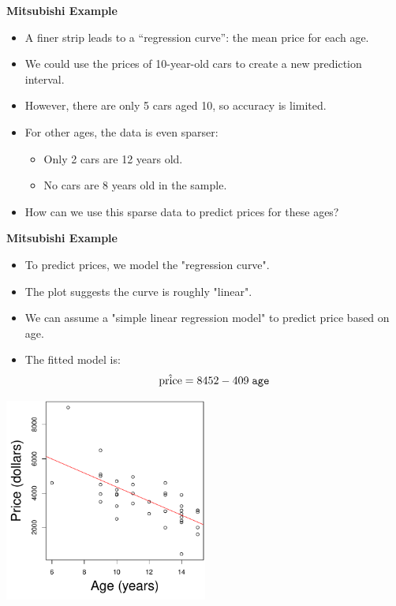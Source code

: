 \documentclass[landscape]{slides}
\newcommand{\heading}[1]{%
  \begin{center}
    \large\bf \color{red}
        #1
  \end{center}
  \vspace{1ex minus 1ex}}
\begin{document}
\begin{slide}
	\heading{Mitsubishi Example}

	\begin{itemize}
		\item A finer strip leads to a “regression curve”: the mean price for each age.\vspace{-1em}
		\item We could use the prices of 10-year-old cars to create a new prediction interval.\vspace{-1em}
		\item However, there are only 5 cars aged 10, so accuracy is limited.\vspace{-1em}
		\item For other ages, the data is even sparser:
		\begin{itemize}
			\item Only 2 cars are 12 years old.
			\item No cars are 8 years old in the sample.
		\end{itemize}\vspace{-1em}
		\item How can we use this sparse data to predict prices for these ages?
	\end{itemize}
	
\end{slide}

\begin{slide}
	\heading{Mitsubishi Example}
	
	\begin{itemize}
		\item To predict prices, we model the  "regression curve".
		\item The plot suggests the curve is roughly  "linear".
		\item We can assume a  "simple linear regression model" to predict price based on age.
		

		\item The fitted model is:
		$$\hat{\mbox{price}} = 8452 - 409 \; {\tt age}$$
	\end{itemize}
	
\end{slide}

\begin{slide}
	\begin{center}
		\includegraphics[width=0.5\textwidth]{figures/7-LinearModels-Figures/mitsub_reg.pdf}
	\end{center}
	
\end{slide}
\end{document}
